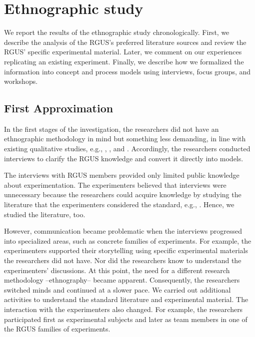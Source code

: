 \section{Ethnographic study}\label{sec-reseach-execution}
We report the results of the ethnographic study chronologically. First, we describe the analysis of the RGUS's preferred literature sources and review the RGUS' specific experimental material. Later, we comment on our experiences replicating an existing experiment. Finally, we describe how we formalized the information into concept and process models using interviews, focus groups, and workshops.

\subsection{First Approximation}
In the first stages of the investigation, the researchers did not have an ethnographic methodology in mind but something less demanding, in line with existing qualitative studies, e.g., \cite{Johanssen-2019-Continuous-SE-support}, \cite{Strandberg-2019-Ethical-Interviews-SE}, and \cite{Yang-2021-interview-study-developers}. Accordingly, the researchers conducted interviews to clarify the RGUS knowledge and convert it directly into models. 

The interviews with RGUS members provided only limited public knowledge about experimentation. The experimenters believed that interviews were unnecessary because the researchers could acquire knowledge by studying the literature that the experimenters considered the standard, e.g., \cite{Wohlin-2000-Experimentation-SE}. Hence, we studied the literature, too.

However, communication became problematic when the interviews progressed into specialized areas, such as concrete families of experiments. For example, the experimenters supported their storytelling using specific experimental materials the researchers did not have. Nor did the researchers know to understand the experimenters' discussions. At this point, the need for a different research methodology --ethnography-- became apparent. Consequently, the researchers switched minds and continued at a slower pace. We carried out additional activities to understand the standard literature and experimental material. The interaction with the experimenters also changed. For example, the researchers participated first as experimental subjects and later as team members in one of the RGUS families of experiments.


